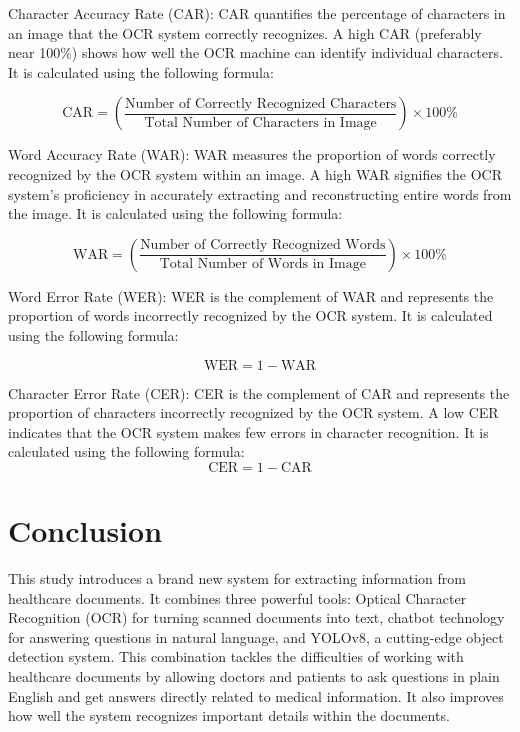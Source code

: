 \documentclass[conference]{IEEEtran}
\begin{document}
        Character Accuracy Rate (CAR): CAR quantifies the percentage of characters in an image that the OCR system correctly recognizes. A high CAR (preferably near 100\%) shows how well the OCR machine can identify individual characters. It is calculated using the following formula:
        
        \begin{equation}
            \text{CAR} = \textstyle\left( \frac{\text{Number of Correctly Recognized Characters}}{\text{Total Number of Characters in Image}} \right) \times 100\%
        \end{equation}
        
        Word Accuracy Rate (WAR): WAR measures the proportion of words correctly recognized by the OCR system within an image. A high WAR signifies the OCR system's proficiency in accurately extracting and reconstructing entire words from the image. It is calculated using the following formula:
        
        \begin{equation}
            \text{WAR} = \textstyle\left( \frac{\text{Number of Correctly Recognized Words}}{\text{Total Number of Words in Image}} \right) \times 100\%
        \end{equation}
        
        Word Error Rate (WER): WER is the complement of WAR and represents the proportion of words incorrectly recognized by the OCR system. It is calculated using the following formula:
        
        \begin{equation}
        \text{WER} = 1 - \text{WAR}
        \end{equation}
        
        Character Error Rate (CER): CER is the complement of CAR and represents the proportion of characters incorrectly recognized by the OCR system. A low CER indicates that the OCR system makes few errors in character recognition. It is calculated using the following formula:
        \begin{equation}
        \text{CER} = 1 - \text{CAR}
        \end{equation}    

\section{Conclusion}
\label{conclusions}
 
This study introduces a brand new system for extracting information from healthcare documents. It combines three powerful tools: Optical Character Recognition (OCR) for turning scanned documents into text, chatbot technology for answering questions in natural language, and YOLOv8, a cutting-edge object detection system. This combination tackles the difficulties of working with healthcare documents by allowing doctors and patients to ask questions in plain English and get answers directly related to medical information. It also improves how well the system recognizes important details within the documents.
\end{document}

